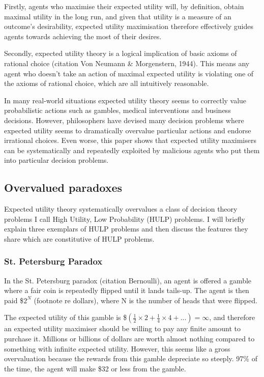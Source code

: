\documentclass{article}
\begin{document}
Firstly, agents who maximise their expected utility will, by definition, obtain maximal utility in the long run, and given that utility is a measure of an outcome's desirability, expected utility maximisation therefore effectively guides agents towards achieving the most of their desires.

Secondly, expected utility theory is a logical implication of basic axioms of rational choice (citation Von Neumann \& Morgenstern, 1944). This means any agent who doesn't take an action of maximal expected utility is violating one of the axioms of rational choice, which are all intuitively reasonable.

In many real-world situations expected utility theory seems to correctly value probabilistic actions such as gambles, medical interventions and business decisions. However, philosophers have devised many decision problems where expected utility seems to dramatically overvalue particular actions and endorse irrational choices. Even worse, this paper shows that expected utility maximisers can be systematically and repeatedly exploited by malicious agents who put them into particular decision problems. 

\subsection {Overvalued paradoxes}

Expected utility theory systematically overvalues a class of decision theory problems I call High Utility, Low Probability (HULP) problems. I will briefly explain three exemplars of HULP problems and then discuss the features they share which are constitutive of HULP problems.

\subsubsection {St. Petersburg Paradox}

In the St. Petersburg paradox (citation Bernoulli), an agent is offered a gamble where a fair coin is repeatedly flipped until it lands tails-up. The agent is then paid \$\(2^N\) (footnote re dollars), where N is the number of heads that were flipped. 

The expected utility of this gamble is \$\((\frac{1}{2}\times2 + \frac{1}{4}\times4+...) = \infty\), and therefore an expected utility maximiser should be willing to pay any finite amount to purchase it. Millions or billions of dollars are worth almost nothing compared to something with infinite expected utility. However, this seems like a gross overvaluation because the rewards from this gamble depreciate so steeply. 97\% of the time, the agent will make \$32 or less from the gamble. 
\end{document}
